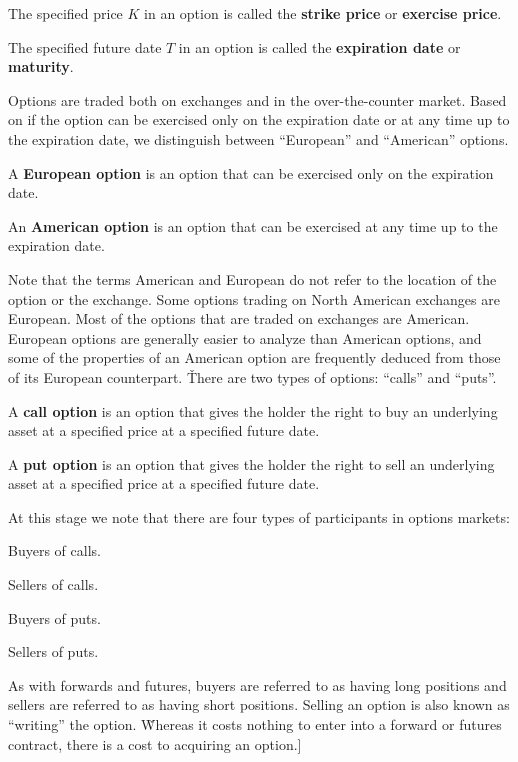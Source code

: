 The specified price $K$ in an option is called the \textbf{strike price} or \textbf{exercise price}.
\ed

The specified future date $T$ in an option is called the \textbf{expiration date} or \textbf{maturity}.
\ed

Options are traded both on exchanges and in the over-the-counter market. Based on if the option can be exercised only
on the expiration date or at any time up to the expiration date, we distinguish between ``European'' and ``American''
options.

A \textbf{European option} is an option that can be exercised only on the expiration date.
\ed

An \textbf{American option} is an option that can be exercised at any time up to the expiration date.
\ed

Note that the terms American and European do not refer to the location of the option or the exchange. Some options
trading on North American exchanges are European. Most of the options that are traded on exchanges are American.
European options are generally easier to analyze than American options, and some of the properties of an American
option are frequently deduced from those of its European counterpart. \v

There are two types of options: ``calls'' and ``puts''.

A \textbf{call option} is an option that gives the holder the right to buy an underlying asset at a specified price
at a specified future date.
\ed

A \textbf{put option} is an option that gives the holder the right to sell an underlying asset at a specified price
at a specified future date.
\ed

At this stage we note that there are four types of participants in options markets:
\bit
\item Buyers of calls.
\item Sellers of calls.
\item Buyers of puts.
\item Sellers of puts.
\eit

As with forwards and futures, buyers are referred to as having long positions and sellers are referred to as having
short positions. Selling an option is also known as ``writing'' the option. \v

Whereas it costs nothing to enter into a forward or futures contract, there is a cost to acquiring an option.]

